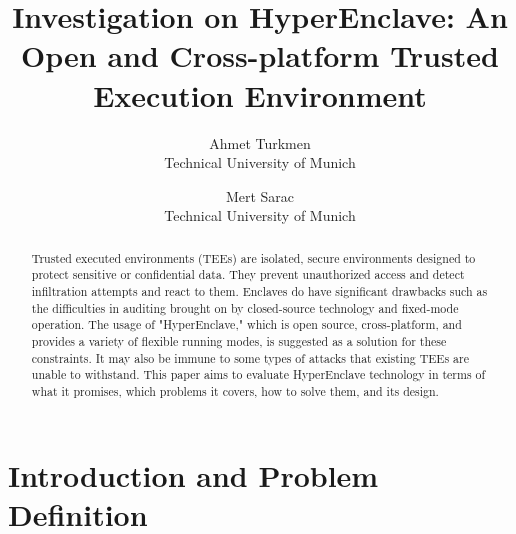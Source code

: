 

\date{}

\title{\Large Investigation on
    HyperEnclave: An Open and Cross-platform Trusted Execution Environment}

\author{
{\rm Ahmet Turkmen}\\
Technical University of Munich
\and
{\rm Mert Sarac}\\
Technical University of Munich
} %

\maketitle


\begin{abstract}
Trusted executed environments (TEEs) are isolated, secure environments designed to protect sensitive or confidential data. They prevent unauthorized access and detect infiltration attempts and react to them. Enclaves do have significant drawbacks such as the difficulties in auditing brought on by closed-source technology and fixed-mode operation. The usage of "HyperEnclave," which is open source, cross-platform, and provides a variety of flexible running modes, is suggested as a solution for these constraints. It may also be immune to some types of attacks that existing TEEs are unable to withstand. This paper aims to evaluate HyperEnclave technology in terms of what it promises, which problems it covers, how to solve them, and its design.
\end{abstract}


\section{Introduction and Problem Definition}

